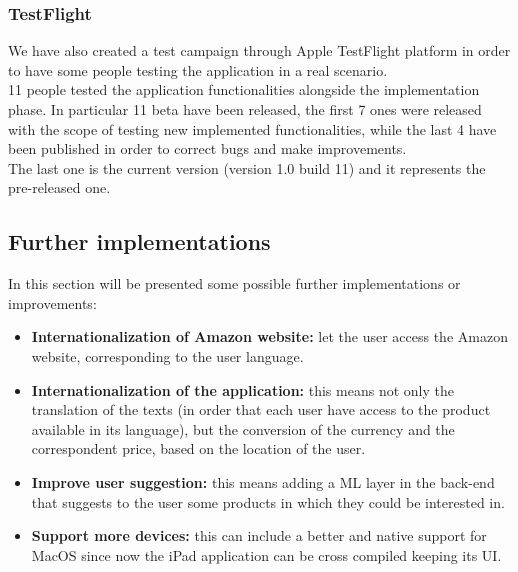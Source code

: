 \subsubsection{TestFlight}
We have also created a test campaign through Apple TestFlight platform in order to have some people testing the application in a real scenario.\\
11 people tested the application functionalities alongside the implementation phase. In particular 11 beta have been released, the first 7 ones were released with the scope of testing new implemented functionalities, while the last 4 have been published in order to correct bugs and make improvements.\\
The last one is the current version (version 1.0 build 11) and it represents the pre-released one.

\subsection{Further implementations}
In this section will be presented some possible further implementations or improvements:

\begin{itemize}
    \item \textbf{Internationalization of Amazon website:} let the user access the Amazon website, corresponding to the user language.
    \item \textbf{Internationalization of the application:} this means not only the translation of the texts (in order that each user have access to the product available in its language), but the conversion of the currency and the correspondent price, based on the location of the user.
    \item \textbf{Improve user suggestion:} this means adding a ML layer in the back-end that suggests to the user some products in which they could be interested in.
    \item \textbf{Support more devices:} this can include a better and native support for MacOS since now the iPad application can be cross compiled keeping its UI.
\end{itemize}